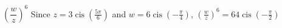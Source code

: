 { $\left(\dfrac{w}{z}\right)^6$ }
{ Since $z = 3\operatorname{cis}\left(\frac{5\pi}{6}\right)$ and $w = 6\operatorname{cis}\left(-\frac{\pi}{4}\right)$,  $\left(\frac{w}{z}\right)^6 =64\operatorname{cis}\left(-\frac{\pi}{2} \right)$}
